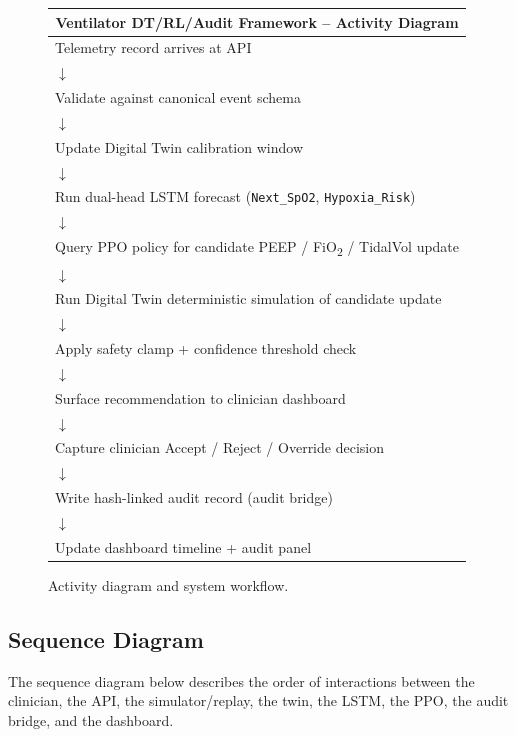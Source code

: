 \documentclass[12pt,a4paper,oneside]{report}
\begin{document}
\begin{figure}[h]
\centering
\begin{tabular}{|p{4.2in}|}
\hline
\multicolumn{1}{|c|}{\textbf{Ventilator DT/RL/Audit Framework -- Activity Diagram}}\\
\hline
Telemetry record arrives at API\\
$\downarrow$\\
Validate against canonical event schema\\
$\downarrow$\\
Update Digital Twin calibration window\\
$\downarrow$\\
Run dual-head LSTM forecast (\texttt{Next\_SpO2}, \texttt{Hypoxia\_Risk})\\
$\downarrow$\\
Query PPO policy for candidate PEEP / FiO\textsubscript{2} / TidalVol update\\
$\downarrow$\\
Run Digital Twin deterministic simulation of candidate update\\
$\downarrow$\\
Apply safety clamp + confidence threshold check\\
$\downarrow$\\
Surface recommendation to clinician dashboard\\
$\downarrow$\\
Capture clinician Accept / Reject / Override decision\\
$\downarrow$\\
Write hash-linked audit record (audit bridge)\\
$\downarrow$\\
Update dashboard timeline + audit panel\\
\hline
\end{tabular}
\caption{Activity diagram and system workflow.}
\label{fig:activity}
\end{figure}

\subsection{Sequence Diagram}
The sequence diagram below describes the order of interactions between the clinician, the API, the simulator/replay, the twin, the LSTM, the PPO, the audit bridge, and the dashboard.
\end{document}
